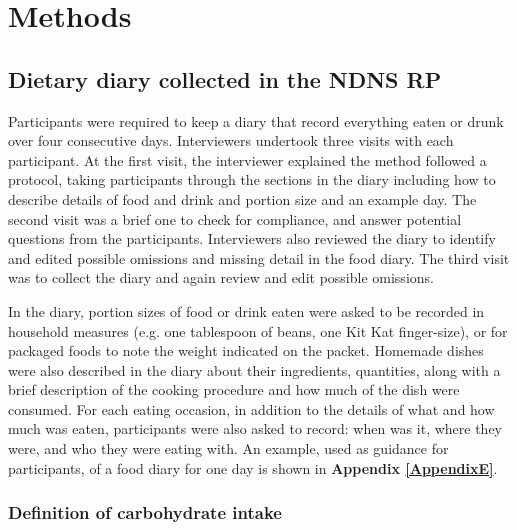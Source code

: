 
\chapter{Methods} %

\label{Chapter 2} %


\section{Dietary diary collected in the NDNS RP}\vspace{-0.3cm}

Participants were required to keep a diary that record everything eaten or drunk over four consecutive days. Interviewers undertook three visits with each participant. At the first visit, the interviewer explained the method followed a protocol, taking participants through the sections in the diary including how to describe details of food and drink and portion size and an example day. The second visit was a brief one to check for compliance, and answer potential questions from the participants. Interviewers also reviewed the diary to identify and edited possible omissions and missing detail in the food diary. The third visit was to collect the diary and again review and edit possible omissions. 

In the diary, portion sizes of food or drink eaten were asked to be recorded in household measures (e.g. one tablespoon of beans, one Kit Kat finger-size), or for packaged foods to note the weight indicated on the packet. Homemade dishes were also described in the diary about their ingredients, quantities, along with a brief description of the cooking procedure and how much of the dish were consumed. For each eating occasion, in addition to the details of what and how much was eaten, participants were also asked to record: when was it, where they were, and who they were eating with. An example, used as guidance for participants, of a food diary for one day is shown in \textbf{Appendix \ref{AppendixE}}.\vspace{-0.3cm}

\subsection{Definition of carbohydrate intake}\vspace{-0.3cm}

